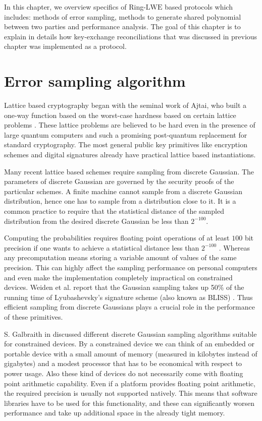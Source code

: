 In this chapter, we overview specifics of Ring-$\mathrm{LWE}$ based protocols which includes: methods of error sampling, methods to generate shared polynomial between two parties and performance analysis. The goal of this chapter is to explain in details how key-exchange reconciliations that was discussed in previous chapter was implemented as a protocol.


\section{Error sampling algorithm}
Lattice based cryptography began with the seminal work of Ajtai, who built a one-way function based on the worst-case hardness based on certain lattice problems \cite{ajtai1996generating}. These lattice problems are believed to be hard even in the presence of large quantum computers and such a promising post-quantum replacement for standard cryptography. The most general public key primitives like encryption schemes \cite{cryptoeprint:2012:230} and digital signatures \cite{cryptoeprint:2011:537} already have practical lattice based instantiations.

Many recent lattice based schemes require sampling from discrete Gaussian. The parameters of discrete Gaussian are governed by the security proofs of the particular schemes. A finite machine cannot sample from a discrete Gaussian distribution, hence one has to sample from a distribution close to it. It is a common practice to require that the statistical distance of the sampled distribution from the desired discrete Gaussian be less than $2^{-100}$.

Computing the probabilities requires floating point operations of at least $100$ bit precision if one wants to achieve a statistical distance less than $2^{-100}$ \cite{Janos2014}. Whereas any precomputation means storing a variable amount of values of the same precision. This can highly affect the sampling performance on personal computers and even make the implementation completely impractical on constrained devices. Weiden et al. \cite{cryptoeprint:2013:065} report that the Gaussian sampling takes up 50\% of the running time of Lyubashevsky's signature scheme (also known as BLISS) \cite{cryptoeprint:2011:537}. Thus efficient sampling from discrete Gaussians plays a crucial role in the performance
of these primitives.

S. Galbraith in \cite{Dwarakanath:2014:SDG:2635676.2635683} discussed different discrete Gaussian sampling algorithms suitable for constrained devices. By a constrained device we can think of an embedded or portable device with a small amount of memory (measured in kilobytes instead of gigabytes) and a modest processor that has to be economical with respect to power usage. Also these kind of devices do not necessarily come with floating point arithmetic capability. Even if a platform provides floating point arithmetic, the required precision is usually not supported natively. This means that software libraries have to be used for this functionality, and these can significantly worsen performance and take up additional space in the already tight memory.

